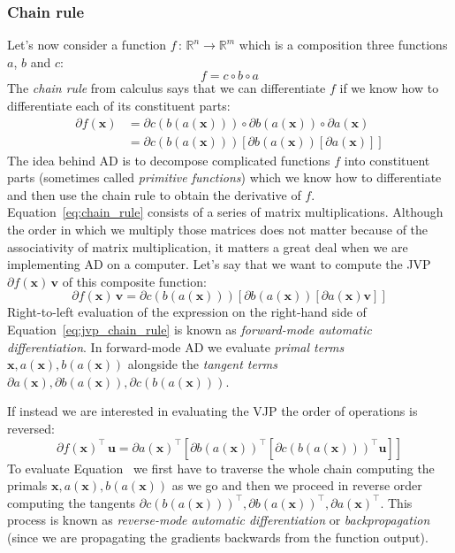 \documentclass[12pt,dvipsnames]{report}
\renewcommand{\vec}[1]{\boldsymbol{\mathbf{#1}}}
\begin{document}
\subsubsection{Chain rule}
Let's now consider a function $f\,:\, \mathbb{R}^n\rightarrow\mathbb{R}^m$ which is a composition
three functions $a$, $b$ and $c$:
\begin{equation}
f=c \circ b \circ a
\end{equation}
The \textsl{chain rule} from calculus says that we can differentiate $f$ if we know how to differentiate 
each of its constituent parts:
\begin{align}
\partial f(\vec{x})&=\partial c(b(a(\vec{x}))) \circ \partial b(a(\vec{x})) \circ \partial a(\vec{x})\\
&=\partial c(b(a(\vec{x})))[\partial b(a(\vec{x}))[\partial a(\vec{x})]]
\label{eq:chain_rule}
\end{align}
The idea behind AD is to decompose complicated functions $f$ into constituent parts (sometimes 
called \textsl{primitive functions}) which we know how to differentiate  and then use the chain 
rule to obtain the derivative of $f$.
Equation~\ref{eq:chain_rule} consists of a series of matrix multiplications. Although the order
in which we multiply those matrices does not matter because of the associativity of matrix 
multiplication, it matters a great deal when we are implementing AD on a computer.
Let's say that we want to compute the JVP $\partial f(\vec{x})\,\vec v$ of this composite 
function:
\begin{equation}
 \partial f(\vec{x})\,\vec v = \partial c(b(a(\vec{x})))[\partial b(a(\vec{x}))[\partial a(\vec{x})\vec v]]
 \label{eq:jvp_chain_rule}
\end{equation}
Right-to-left evaluation of the expression on the right-hand side of 
Equation~\ref{eq:jvp_chain_rule} is known  as \textsl{forward-mode automatic differentiation}.
In forward-mode AD we evaluate \textsl{primal terms} $\vec{x}, a(\vec{x}), b(a(\vec{x}))$ 
alongside the \textsl{tangent terms} 
$\partial a(\vec{x}), \partial b(a(\vec{x})), \partial c(b(a(\vec{x})))$.

If instead we are interested in evaluating the VJP the order of operations is reversed:
\begin{equation}
\partial f(\vec{x})^{\intercal}\,\vec u=\partial a(\vec{x})^{\intercal}\left[\partial b(a(\vec{x}))^\intercal\left[\partial c(b(a(\vec{x})))^{\intercal}\vec u\right]\right]
\label{eq:vjp_chain_rule}
\end{equation}
To evaluate  Equation~\label{eq:vjp_chain_rule} we first have to traverse the whole chain 
computing the primals $\vec{x}, a(\vec{x}), b(a(\vec{x}))$ as we go and then we proceed in reverse order 
computing the tangents 
$\partial c(b(a(\vec{x})))^{\intercal}, \partial b(a(\vec{x}))^{\intercal}, \partial a(\vec{x})^{\intercal}$.
This process is known as \textsl{reverse-mode automatic differentiation} or 
\textsl{backpropagation} (since we are propagating the gradients backwards from the function output).
\end{document}
